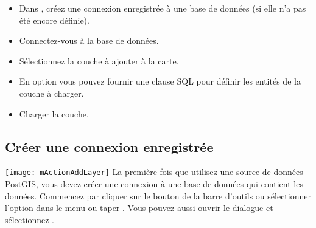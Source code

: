 \begin{itemize}[label=--]
\item Dans \qg, créez une connexion enregistrée à une base de données \psq (si elle n'a pas été encore définie).
\item Connectez-vous à la base de données.
\item Sélectionnez la couche à ajouter à la carte.
\item En option vous pouvez fournir une clause SQL  pour définir les entités de la couche à charger.
\item Charger la couche.
\end{itemize}

\subsection{Créer une connexion enregistrée}  \label{sec:postgis_stored}

\texttt{[image: mActionAddLayer]} La première fois que utilisez une source de données PostGIS, vous devez créer une connexion à une base de données \psq qui contient les données. Commencez par cliquer sur le bouton  de la barre d'outils ou sélectionner l'option  dans le menu  ou taper . Vous pouvez aussi ouvrir le dialogue  et sélectionnez .

